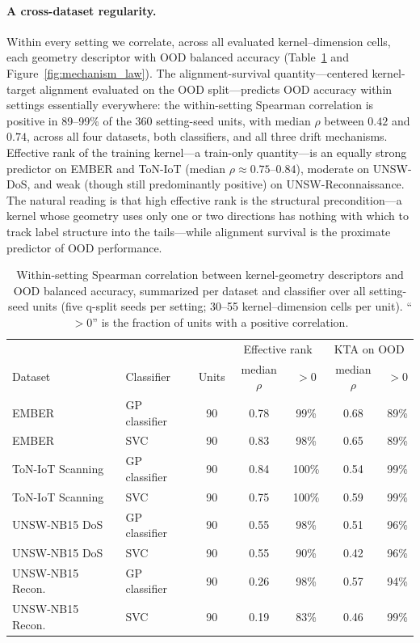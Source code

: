 \documentclass[journal]{IEEEtran}
\begin{document}
\paragraph{A cross-dataset regularity.}
Within every setting we correlate, across all evaluated kernel--dimension cells, each geometry descriptor with OOD balanced accuracy (Table~\ref{tab:mechanism} and Figure~\ref{fig:mechanism_law}). The alignment-survival quantity---centered kernel-target alignment evaluated on the OOD split---predicts OOD accuracy within settings essentially everywhere: the within-setting Spearman correlation is positive in 89--99\% of the 360 setting-seed units, with median $\rho$ between $0.42$ and $0.74$, across all four datasets, both classifiers, and all three drift mechanisms. Effective rank of the training kernel---a train-only quantity---is an equally strong predictor on EMBER and ToN-IoT (median $\rho\approx0.75$--$0.84$), moderate on UNSW-DoS, and weak (though still predominantly positive) on UNSW-Reconnaissance. The natural reading is that high effective rank is the structural precondition---a kernel whose geometry uses only one or two directions has nothing with which to track label structure into the tails---while alignment survival is the proximate predictor of OOD performance.

\begin{table}[!t]
\centering
\caption{Within-setting Spearman correlation between kernel-geometry descriptors and OOD balanced accuracy, summarized per dataset and classifier over all setting-seed units (five q-split seeds per setting; 30--55 kernel--dimension cells per unit). ``$>0$'' is the fraction of units with a positive correlation.}
\label{tab:mechanism}
\small
\setlength{\tabcolsep}{5pt}
\begin{tabular}{llccccc}
\toprule
 & & & \multicolumn{2}{c}{Effective rank} & \multicolumn{2}{c}{KTA on OOD} \\
Dataset & Classifier & Units & median $\rho$ & $>0$ & median $\rho$ & $>0$ \\
\midrule
EMBER & GP classifier & 90 & 0.78 & 99\% & 0.68 & 89\% \\
EMBER & SVC & 90 & 0.83 & 98\% & 0.65 & 89\% \\
ToN-IoT Scanning & GP classifier & 90 & 0.84 & 100\% & 0.54 & 99\% \\
ToN-IoT Scanning & SVC & 90 & 0.75 & 100\% & 0.59 & 99\% \\
UNSW-NB15 DoS & GP classifier & 90 & 0.55 & 98\% & 0.51 & 96\% \\
UNSW-NB15 DoS & SVC & 90 & 0.55 & 90\% & 0.42 & 96\% \\
UNSW-NB15 Recon. & GP classifier & 90 & 0.26 & 98\% & 0.57 & 94\% \\
UNSW-NB15 Recon. & SVC & 90 & 0.19 & 83\% & 0.46 & 99\% \\
\bottomrule
\end{tabular}
\end{table}
\end{document}
